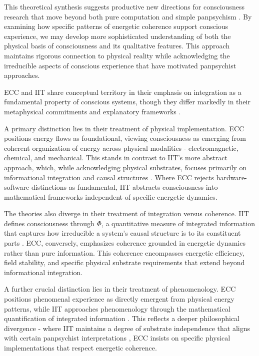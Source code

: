 This theoretical synthesis suggests productive new directions for consciousness research that move beyond both pure computation and simple panpsychism \cite{Koch2019}. By examining how specific patterns of energetic coherence support conscious experience, we may develop more sophisticated understanding of both the physical basis of consciousness and its qualitative features. This approach maintains rigorous connection to physical reality while acknowledging the irreducible aspects of conscious experience that have motivated panpsychist approaches.

ECC and IIT share conceptual territory in their emphasis on integration as a fundamental property of conscious systems, though they differ markedly in their metaphysical commitments and explanatory frameworks \cite{Tononi2008}. 

A primary distinction lies in their treatment of physical implementation. ECC positions energy flows as foundational, viewing consciousness as emerging from coherent organization of energy across physical modalities - electromagnetic, chemical, and mechanical. This stands in contrast to IIT's more abstract approach, which, while acknowledging physical substrates, focuses primarily on informational integration and causal structures \cite{Tononi2016}. Where ECC rejects hardware-software distinctions as fundamental, IIT abstracts consciousness into mathematical frameworks independent of specific energetic dynamics.

The theories also diverge in their treatment of integration versus coherence. IIT defines consciousness through $\Phi$, a quantitative measure of integrated information that captures how irreducible a system's causal structure is to its constituent parts \cite{Oizumi2014}. ECC, conversely, emphasizes coherence grounded in energetic dynamics rather than pure information. This coherence encompasses energetic efficiency, field stability, and specific physical substrate requirements that extend beyond informational integration.

A further crucial distinction lies in their treatment of phenomenology. ECC positions phenomenal experience as directly emergent from physical energy patterns, while IIT approaches phenomenology through the mathematical quantification of integrated information \cite{Tononi2015}. This reflects a deeper philosophical divergence - where IIT maintains a degree of substrate independence that aligns with certain panpsychist interpretations \cite{Koch2019}, ECC insists on specific physical implementations that respect energetic coherence.

